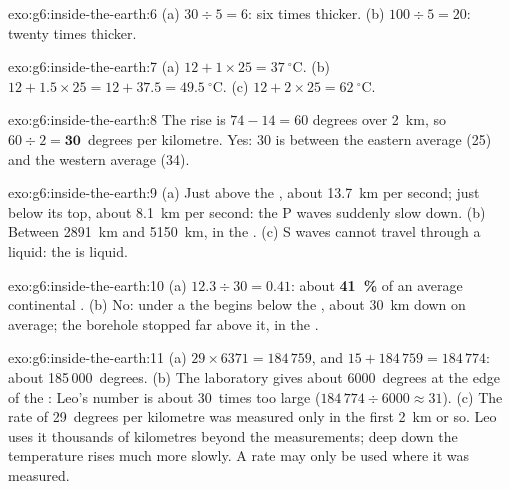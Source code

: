 \begin{solution}{exo:g6:inside-the-earth:6}
(a) $30 \div 5 = 6$: six times thicker. (b) $100 \div 5 = 20$: twenty times
thicker.
\end{solution}

\begin{solution}{exo:g6:inside-the-earth:7}
(a) $12 + 1 \times 25 = 37~^\circ$C. (b) $12 + 1.5 \times 25 = 12 + 37.5 =
49.5~^\circ$C. (c) $12 + 2 \times 25 = 62~^\circ$C.
\end{solution}

\begin{solution}{exo:g6:inside-the-earth:8}
The rise is $74 - 14 = 60$ degrees over 2~km, so $60 \div 2 =
\textbf{30}$~degrees per kilometre. Yes: 30 is between the eastern average
(25) and the western average (34).
\end{solution}

\begin{solution}{exo:g6:inside-the-earth:9}
(a) Just above the , about 13.7~km per second; just below its top,
about 8.1~km per second: the P waves suddenly slow down. (b) Between
2891~km and 5150~km, in the . (c) S waves cannot travel through a
liquid: the  is liquid.
\end{solution}

\begin{solution}{exo:g6:inside-the-earth:10}
(a) $12.3 \div 30 = 0.41$: about \textbf{41~\%} of an average continental
. (b) No: under a  the  begins below the , about
30~km down on average; the borehole stopped far above it, in the .
\end{solution}

\begin{solution}{exo:g6:inside-the-earth:11}
(a) $29 \times 6371 = 184\,759$, and $15 + 184\,759 = 184\,774$: about
185\,000~degrees. (b) The laboratory gives about 6000~degrees at the edge of
the : Leo's number is about 30~times too large
($184\,774 \div 6000 \approx 31$). (c) The rate of 29~degrees per kilometre
was measured only in the first 2~km or so. Leo uses it thousands of
kilometres beyond the measurements; deep down the temperature rises much
more slowly. A rate may only be used where it was measured.
\end{solution}

